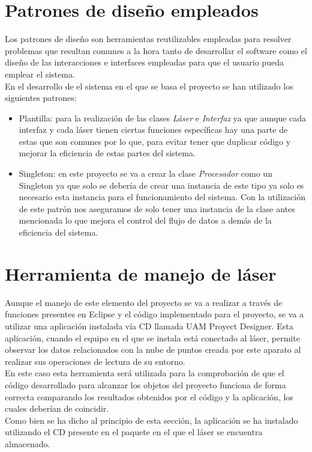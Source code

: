 \section{Patrones de diseño empleados}

Los patrones de diseño son herramientas reutilizables empleadas para resolver problemas que resultan comunes a la hora tanto de desarrollar el software como el diseño de las interacciones e interfaces empleadas para que el usuario pueda emplear el sistema.\\
En el desarrollo de el sistema en el que se basa el proyecto se han utilizado los siguientes patrones:
\begin{itemize}
    \item Plantilla: para la realización de las clases \textit{Láser} e \textit{Interfaz} ya que aunque cada interfaz y cada láser tienen ciertas funciones específicas hay una parte de estas que son comunes por lo que, para evitar tener que duplicar código y mejorar la eficiencia de estas partes del sistema.
    \item Singleton: en este proyecto se va a crear la clase \textit{Procesador} como un Singleton ya que solo se debería de crear una instancia de este tipo ya solo es necesario esta instancia para el funcionamiento del  sistema. Con la utilización de este patrón nos aseguramos de solo tener una instancia de la clase antes mencionada lo que mejora el control del flujo de datos a demás de la eficiencia del sistema.\\
\end{itemize}

\section{Herramienta de manejo de láser}

Aunque el manejo de este elemento del proyecto se va a realizar a través de funciones presentes en Eclipse y el código implementado para el proyecto, se va a utilizar una aplicación instalada vía CD llamada UAM Proyect Designer. Esta aplicación, cuando el equipo en el que se instala está conectado al láser, permite observar los datos relacionados con la nube de puntos creada por este aparato al realizar sus operaciones de lectura de su entorno.\\
En este caso esta herramienta será utilizada para la comprobación de que el código desarrollado para alcanzar los objetos del proyecto funciona de forma correcta comparando los resultados obtenidos por el código y la aplicación, los cuales deberían de coincidir.\\
Como bien se ha dicho al principio de esta sección, la aplicación se ha instalado utilizando el CD presente en el paquete en el que el láser se encuentra almacenado. 


